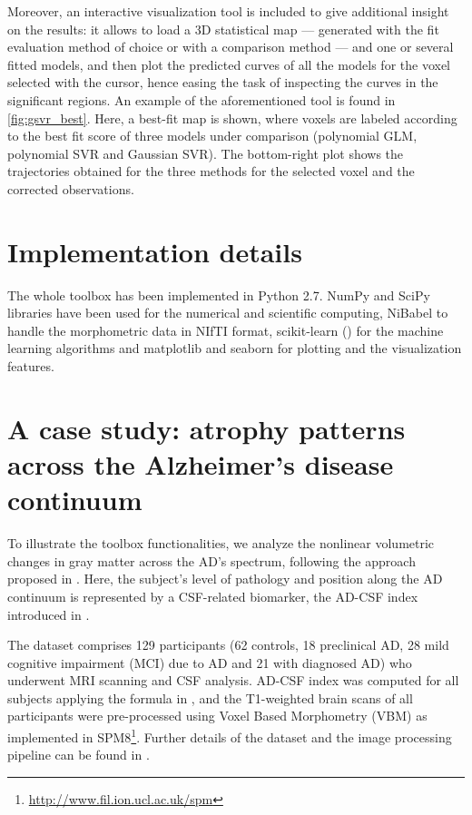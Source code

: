 \documentclass{article}
\begin{document}
Moreover, an interactive visualization tool is included to give additional insight on the results: it allows to load a 3D statistical map — generated with the fit evaluation method of choice or with a comparison method — and one or several fitted models, and then plot the predicted curves of all the models for the voxel selected with the cursor, hence easing the task of inspecting the curves in the significant regions. An example of the aforementioned tool is found in \autoref{fig:gsvr_best}. Here, a best-fit map is shown, where voxels are labeled according to the best fit score of three models under comparison (polynomial GLM, polynomial SVR and Gaussian SVR). The bottom-right plot shows the trajectories obtained for the three methods for the selected voxel and the corrected observations.


\section{Implementation details}

The whole toolbox has been implemented in Python 2.7. NumPy and SciPy libraries have been used for the numerical and scientific computing, NiBabel to handle the morphometric data in NIfTI format, scikit-learn (\cite{scikit-learn}) for the machine learning algorithms and matplotlib and seaborn for plotting and the visualization features.


\section{A case study: atrophy patterns across the Alzheimer's disease continuum}

To illustrate the toolbox functionalities, we analyze the nonlinear volumetric changes in gray matter across the AD's spectrum, following the approach proposed in \cite{Nonlinear_Gispert_2015}. Here, the subject's level of pathology and position along the AD continuum is represented by a CSF-related biomarker, the AD-CSF index introduced in \cite{ADCSF_Molinuevo_2013}. 

The dataset comprises 129 participants (62 controls, 18 preclinical AD, 28 mild cognitive impairment (MCI) due to AD and 21 with diagnosed AD) who underwent MRI scanning and CSF analysis. AD-CSF index was computed for all subjects applying the formula in \cite{ADCSF_Molinuevo_2013}, and the T1-weighted brain scans of all participants were pre-processed using Voxel Based Morphometry (VBM) as implemented in SPM8\footnote{\url{http://www.fil.ion.ucl.ac.uk/spm}}. Further details of the 
dataset and the image processing pipeline can be found in \cite{Nonlinear_Gispert_2015}.
\end{document}

